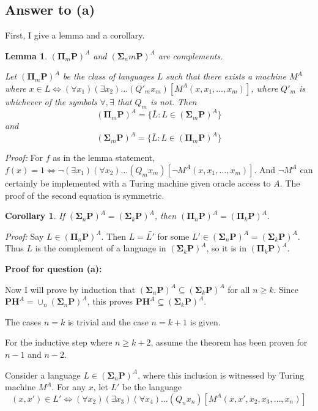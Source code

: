 \documentclass{article}
\renewcommand{\P}{\mathbf{P}}
\newcommand{\PH}{\mathbf{PH}}
\newcommand{\BSigma}{\mathbf{\Sigma}}
\newcommand{\BPi}{\mathbf{\Pi}}
\newtheorem{lemma}{Lemma}
\newtheorem{cor}{Corollary}
\begin{document}
\subsection*{Answer to (a)}

First, I give a lemma and a corollary.

\begin{lemma}{$(\BPi_m \P)^A$ and $(\BSigma_nm \P)^A$ are complements.}

	Let $(\BPi_m \P)^A$ be the class of languages $L$ such that there exists a machine $M^A$ where $x \in L \iff (\forall x_1) (\exists x_2) \dots (Q'_m x_m)[M^A(x, x_1, \dots, x_m)]$, where $Q'_m$ is whichever of the symbols $\forall, \exists$ that $Q_m$ is not.
Then $$
(\BPi_m \P)^A = \{\bar{L} : L \in (\BSigma_m \P)^A\}
$$ and
$$
(\BSigma_m \P)^A = \{\bar{L} : L \in (\BPi_m \P)^A\}
$$

\end{lemma}

\textit{Proof:} For $f$ as in the lemma statement, $f(x) = 1 \iff \neg (\exists x_1) (\forall x_2) \dots (Q_m x_m) [\neg M^A(x, x_1, \dots, x_m)]$.  And $\neg M^A$ can certainly be implemented with a Turing machine given oracle access to $A$.  The proof of the second equation is symmetric.

\begin{cor}
	If $(\BSigma_n \P)^A = (\BSigma_k \P)^A$, then $(\BPi_n \P)^A = (\BPi_k \P)^A$.
\end{cor}

\textit{Proof:} Say $L \in (\BPi_n \P)^A$. Then $L = \bar{L'}$ for some $L' \in (\BSigma_n \P)^A = (\BSigma_k \P)^A$.  Thus $L$ is the complement of a language in $(\BSigma_k \P)^A$, so it is in $(\BPi_k \P)^A$.

\bigskip

\noindent \textbf{Proof for question (a):}

Now I will prove by induction that $(\BSigma_n \P)^A \subseteq (\BSigma_k \P)^A$ for all $n \geq k$.  Since $\PH^A = \cup_n (\BSigma_n \P)^A$, this proves $\PH^A \subseteq (\BSigma_k \P)^A$.

The cases $n = k$ is trivial and the case $n = k + 1$ is given.

For the inductive step where $n \geq k + 2$, assume the theorem has been proven for $n - 1$ and $n - 2$.

Consider a language $L \in (\BSigma_n \P)^A$, where this inclusion is witnessed by Turing machine $M^A$.  For any $x$, let $L'$ be the language
$$
(x, x') \in L' \iff (\forall x_2) (\exists x_3) (\forall x_4 ) \dots (Q_n x_n) [M^A(x, x', x_2, x_3, \dots, x_n)]
$$
\end{document}

